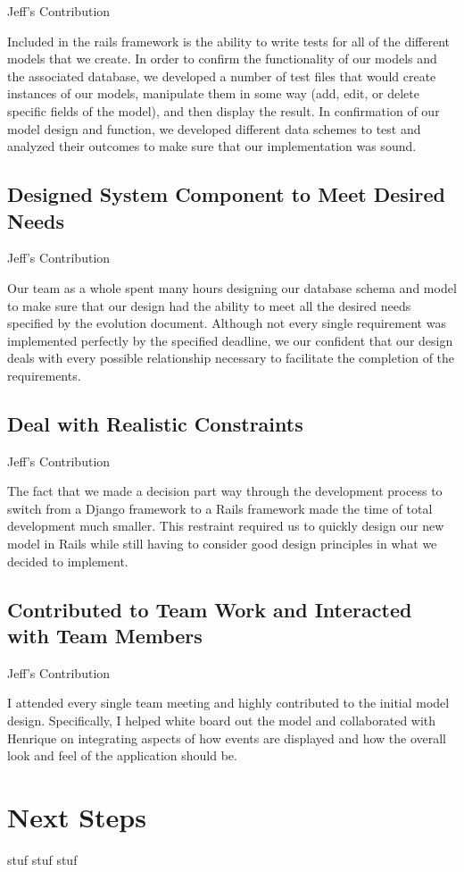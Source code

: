 \documentclass[11pt]{article}
\begin{document}
Jeff's Contribution

Included in the rails framework is the ability to write tests for all of the different models that we create.  In order to confirm the functionality of our models and the associated database, we developed a number of test files that would create instances of our models, manipulate them in some way (add, edit, or delete specific fields of the model), and then display the result.  In confirmation of our model design and function, we developed different data schemes to test and analyzed their outcomes to make sure that our implementation was sound.

\subsection{Designed System Component to Meet Desired Needs}

Jeff's Contribution

Our team as a whole spent many hours designing our database schema and model to make sure that our design had the ability to meet all the desired needs specified by the evolution document.  Although not every single requirement was implemented perfectly by the specified deadline, we our confident that our design deals with every possible relationship necessary to facilitate the completion of the requirements.

\subsection{Deal with Realistic Constraints}

Jeff's Contribution

The fact that we made a decision part way through the development process to switch from a Django framework to a Rails framework made the time of total development much smaller.  This restraint required us to quickly design our new model in Rails while still having to consider good design principles in what we decided to implement.

\subsection{Contributed to Team Work and Interacted with Team Members}

Jeff's Contribution

I attended every single team meeting and highly contributed to the initial model design.  Specifically, I helped white board out the model and collaborated with Henrique on integrating aspects of how events are displayed and how the overall look and feel of the application should be.

\section{Next Steps}

stuf stuf stuf
\end{document}
